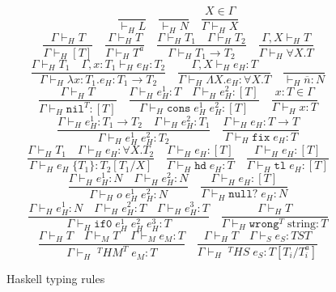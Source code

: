 \begin{figure}[p]
\[
\frac{}{\vdash_{H}L}
\quad
\frac{}{\vdash_{H}N}
\quad
\frac{X\in\Gamma}{\Gamma\vdash_{H}X}
\]
\[
\frac{\Gamma\vdash_{H}T}{\Gamma\vdash_{H}[T]}
\quad
\frac{\Gamma\vdash_{H}T}{\Gamma\vdash_{H}T^{a}}
\quad
\frac{\Gamma\vdash_{H}T_{1}\quad\Gamma\vdash_{H}T_{2}}{\Gamma\vdash_{H}T_{1}\rightarrow T_{2}}
\quad
\frac{\Gamma ,X\vdash_{H}T}{\Gamma\vdash_{H}\forall X.T}
\]
\bigskip
\[
\frac{\Gamma\vdash_{H}T_{1}\quad\Gamma,x:T_{1}\vdash_{H}e_{H}:T_{2}}{\Gamma\vdash_{H}\lambda x:T_{1}.e_{H}:T_{1}\rightarrow T_{2}}
\quad
\frac{\Gamma,X\vdash_{H}e_{H}:T}{\Gamma\vdash_{H}\Lambda X.e_{H}:\forall X.T}
\quad
\frac{}{\vdash_{H}\overline{n}:N}
\]
\[
\frac{\Gamma\vdash_{H}T}{\Gamma\vdash_{H}\mathtt{nil}^{T}:[T]}
\quad
\frac{\Gamma\vdash_{H}e_{H}^{1}:T\quad\Gamma\vdash_{H}e_{H}^{2}:[T]}{\Gamma\vdash_{H}\mathtt{cons}\;e_{H}^{1}\;e_{H}^{2}:[T]}
\quad
\frac{x:T\in\Gamma}{\Gamma\vdash_{H}x:T}
\]
\[
\frac{\Gamma\vdash_{H}e_{H}^{1}:T_{1}\rightarrow T_{2}\quad\Gamma\vdash_{H}e_{H}^{2}:T_{1}}{\Gamma\vdash_{H}e_{H}^{1}\;e_{H}^{2}:T_{2}}
\quad
\frac{\Gamma\vdash_{H}e_{H}:T\rightarrow T}{\Gamma\vdash_{H}\mathtt{fix}\;e_{H}:T}
\]
\[
\frac{\Gamma\vdash_{H}T_{1}\quad\Gamma\vdash_{H}e_{H}:\forall X.T_{2}}{\Gamma\vdash_{H}e_{H}\;\lbrace T_{1}\rbrace:T_{2}[T_{1}/X]}
\quad
\frac{\Gamma\vdash_{H}e_{H}:[T]}{\Gamma\vdash_{H}\mathtt{hd}\;e_{H}:T}
\quad
\frac{\Gamma\vdash_{H}e_{H}:[T]}{\Gamma\vdash_{H}\mathtt{tl}\;e_{H}:[T]}
\]
\[
\frac{\Gamma\vdash_{H}e_{H}^{1}:N\quad\Gamma\vdash_{H}e_{H}^{2}:N}{\Gamma\vdash_{H}o\;e_{H}^{1}\;e_{H}^{2}:N}
\quad
\frac{\Gamma\vdash_{H}e_{H}:[T]}{\Gamma\vdash_{H}\mathtt{null?}\;e_{H}:N}
\]
\[
\frac{\Gamma\vdash_{H}e_{H}^{1}:N\quad\Gamma\vdash_{H}e_{H}^{2}:T\quad\Gamma\vdash_{H}e_{H}^{3}:T}{\Gamma\vdash_{H}\mathtt{if0}\;e_{H}^{1}\;e_{H}^{2}\;e_{H}^{3}:T}
\quad
\frac{\Gamma\vdash_{H}T}{\Gamma\vdash_{H}\mathtt{wrong}^{T}\;\mathrm{string}:T}
\]
\[
\frac{\Gamma\vdash_{H}T\quad\Gamma\vdash_{M}T\quad\Gamma\vdash_{M}e_{M}:T}{\Gamma\vdash_{H}\;^{T}HM^{T}\;e_{M}:T}
\quad
\frac{\Gamma\vdash_{H}T\quad\Gamma\vdash_{S}e_{S}:TST}{\Gamma\vdash_{H}\;^{T}HS\;e_{S}:T[T_{i}/T^{a}_{i}]}
\]
\caption{Haskell typing rules}
\label{htr}
\end{figure}